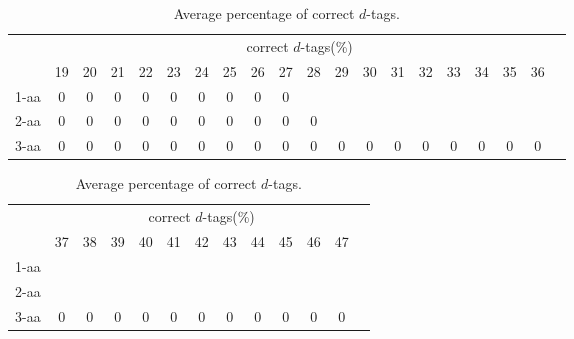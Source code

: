 \begin{table}[h]\tiny
\vspace{3mm}
{\centering
\begin{center}
\begin{tabular}{|l|c|c|c|c|c|c|c|c|c|c|c|c|c|c|c|c|c|c|c|}
  \hline
  & \multicolumn{ 18 }{|c|}{correct $d$-tags(\%)} \\
  \cline{2- 19}
    & 19 & 20 & 21 & 22 & 23 & 24 & 25 & 26 & 27 & 28 & 29 & 30 & 31 & 32 & 33 & 34 & 35 & 36\\
  \hline
1-aa  & 0 & 0 & 0 & 0 & 0 & 0 & 0 & 0 & 0 &  &  &  &  &  &  &  &  & \\
2-aa  & 0 & 0 & 0 & 0 & 0 & 0 & 0 & 0 & 0 & 0 &  &  &  &  &  &  &  & \\
3-aa  & 0 & 0 & 0 & 0 & 0 & 0 & 0 & 0 & 0 & 0 & 0 & 0 & 0 & 0 & 0 & 0 & 0 & 0\\
 \hline
\end{tabular}
\end{center}
\par}
\centering
\caption{ Average percentage of correct $d$-tags.}
\vspace{3mm}
\label{table:correct-d-tags}
\end{table}
\begin{table}[h]\tiny
\vspace{3mm}
{\centering
\begin{center}
\begin{tabular}{|l|c|c|c|c|c|c|c|c|c|c|c|c|}
  \hline
  & \multicolumn{ 11 }{|c|}{correct $d$-tags(\%)} \\
  \cline{2- 12}
    & 37 & 38 & 39 & 40 & 41 & 42 & 43 & 44 & 45 & 46 & 47\\
  \hline
1-aa  &  &  &  &  &  &  &  &  &  &  & \\
2-aa  &  &  &  &  &  &  &  &  &  &  & \\
3-aa  & 0 & 0 & 0 & 0 & 0 & 0 & 0 & 0 & 0 & 0 & 0\\
 \hline
\end{tabular}
\end{center}
\par}
\centering
\caption{ Average percentage of correct $d$-tags.}
\vspace{3mm}
\label{table:correct-d-tags}
\end{table}

